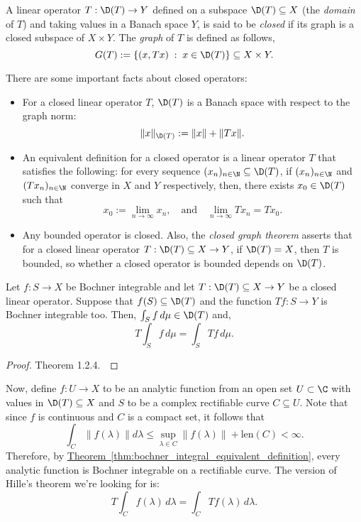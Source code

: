 \begin{definition}\label{def:closed_linear_operator}\label{def:graph}
    A linear operator $T : \D (T) \to Y$ defined on a subspace $\D (T) \subseteq X$ (the \textit{domain} of $T$) and taking values in a Banach space $Y$, is said to be \textit{closed} if its graph is a closed subspace of $X\times Y$. The \textit{graph} of $T$ is defined as follows,
    \[ G(T) := \{(x, Tx) \;:\; x\in \D(T)\} \subseteq X\times Y. \]
\end{definition}

\begin{remark}
    There are some important facts about closed operators:
    \begin{itemize}
        \item For a closed linear operator $T$, $\D(T)$ is a Banach space with respect to the graph norm:
    \[ \|x\|_{\D(T)} := \|x\| + \|Tx\|. \]
        \item An equivalent definition for a closed operator is a linear operator $T$ that satisfies the following: for every sequence $(x_n)_{n\in\N} \subseteq \D(T)$, if $(x_n)_{n\in \N}$ and $(Tx_n)_{n\in \N}$ converge in $X$ and $Y$ respectively, then, there exists $x_0 \in \D(T)$ such that
        \[ x_0 := \lim_{n\to\infty} x_n,\quad \mbox{and} \quad \lim_{n\to\infty} Tx_n = Tx_0. \]
        \item Any bounded operator is closed. Also, the \textit{closed graph theorem} asserts that for a closed linear operator $T : \D(T) \subseteq X \to Y$, if $\D(T) = X$, then $T$ is bounded, so whether a closed operator is bounded depends on $\D(T)$.
    \end{itemize}
\end{remark}

\begin{theorem}\label{thm:hille} Let $f: S\to X$ be Bochner integrable and let $T: \D(T) \subseteq X \to Y$ be a closed linear operator. Suppose that $f(S) \subseteq \D(T)$ and the function $Tf: S \to Y$ is Bochner integrable too. Then, $\int_S f\, d\mu \in \D(T)$ and,
    \[ T\int_S f\, d\mu = \int_S Tf\, d\mu. \]    
\end{theorem}

\begin{proof}
    Theorem 1.2.4.~\cite{hytönen2016analysis}
\end{proof}

Now, define $f: U \to X$ to be an analytic function from an open set $U \subset \C$ with values in $\D(T) \subseteq X$ and $S$ to be a complex rectifiable curve $C \subseteq U$. Note that since $f$ is continuous and $C$ is a compact set, it follows that
\[ \int_{C} \|f(\lambda)\| d\lambda \leq \sup_{\lambda\in C}\|f(\lambda)\| +\mbox{len}(C) < \infty. \]
Therefore, by \hyperref[thm:bochner_integral_equivalent_definition]{Theorem~\ref*{thm:bochner_integral_equivalent_definition}}, every analytic function is Bochner integrable on a rectifiable curve. The version of Hille's theorem we're looking for is:
\[ T\int_C f(\lambda)\, d\lambda = \int_C Tf(\lambda)\, d\lambda. \]

